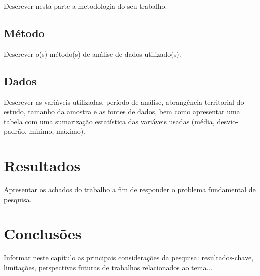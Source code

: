 Descrever nesta parte a metodologia do seu trabalho.

\section{Método}
Descrever o(s) método(s) de análise de dados utilizado(s).

\section{Dados}
Descrever as variáveis utilizadas, período de análise, abrangência territorial do estudo, tamanho da amostra e as fontes de dados, bem como apresentar uma tabela com uma sumarização estatística das variáveis usadas (média, desvio-padrão, mínimo, máximo).

\chapter{Resultados}
Apresentar os achados do trabalho a fim de responder o problema fundamental de pesquisa.

\chapter{Conclusões}
Informar neste capítulo as principais considerações da pesquisa: resultados-chave, limitações, perspectivas futuras de trabalhos relacionados ao tema...


